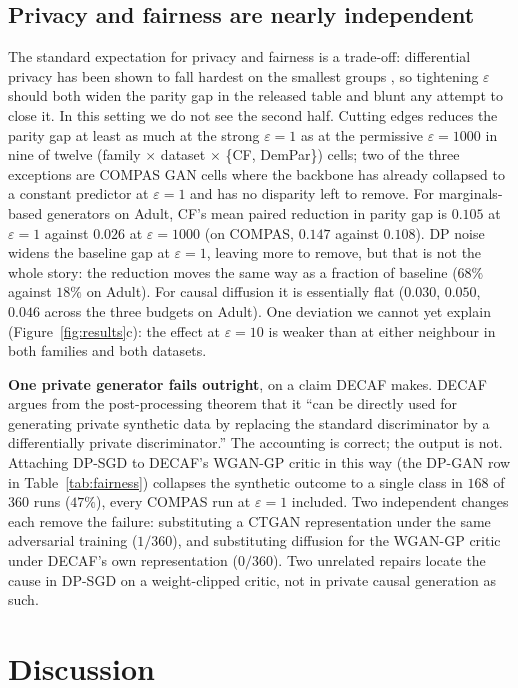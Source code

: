 \documentclass{article}
\begin{document}
\subsection{Privacy and fairness are nearly independent}

The standard expectation for privacy and fairness is a trade-off:
differential privacy has been shown to fall hardest on the smallest groups
\citep{bagdasaryan2019disparate}, so tightening $\varepsilon$ should both
widen the parity gap in the released table and blunt any attempt to close
it. In this setting we do not see the second half. Cutting edges reduces
the parity gap at least as much at the strong $\varepsilon{=}1$ as at the
permissive $\varepsilon{=}1000$ in nine of twelve (family $\times$ dataset
$\times$ \{CF, DemPar\}) cells; two of the three exceptions are COMPAS GAN
cells where the backbone has already collapsed to a constant predictor at
$\varepsilon{=}1$ and has no disparity left to remove. For marginals-based
generators on Adult, CF's mean paired reduction in parity gap is $0.105$ at
$\varepsilon{=}1$ against $0.026$ at $\varepsilon{=}1000$ (on COMPAS, $0.147$
against $0.108$). DP noise widens the baseline gap at $\varepsilon{=}1$,
leaving more to remove, but that is not the whole story: the reduction moves
the same way as a fraction of baseline ($68\%$ against $18\%$ on Adult). For
causal diffusion it is essentially flat ($0.030$, $0.050$, $0.046$ across the
three budgets on Adult). One deviation we cannot yet explain
(Figure~\ref{fig:results}c): the effect at $\varepsilon{=}10$ is weaker than
at either neighbour in both families and both datasets.

\textbf{One private generator fails outright}, on a claim DECAF makes. DECAF
argues from the post-processing theorem that it ``can be directly used for
generating private synthetic data by replacing the standard discriminator by
a differentially private discriminator.'' The accounting is correct; the
output is not. Attaching DP-SGD \citep{abadi2016dpsgd} to DECAF's WGAN-GP
critic in this way (the DP-GAN row in Table~\ref{tab:fairness}) collapses
the synthetic outcome to a single class in $168$ of $360$ runs ($47\%$),
every COMPAS run at $\varepsilon{=}1$ included. Two independent changes each
remove the failure: substituting a CTGAN representation under the same
adversarial training ($1/360$), and substituting diffusion for the WGAN-GP
critic under DECAF's own representation ($0/360$). Two unrelated repairs
locate the cause in DP-SGD on a weight-clipped critic, not in private causal
generation as such.

\section{Discussion}
\label{sec:discussion}
\wkDiscussion





\end{document}
